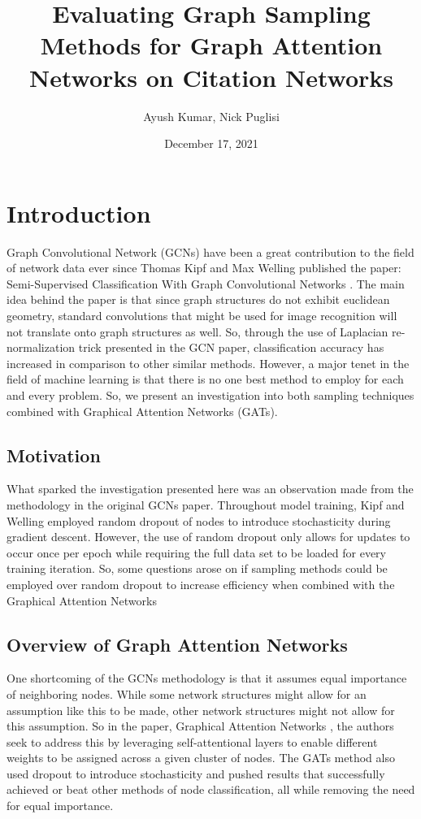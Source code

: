 \documentclass{article}
\title{Evaluating Graph Sampling Methods for Graph Attention Networks on Citation Networks}
\author{Ayush Kumar, Nick Puglisi}
\date{December 17, 2021}
\begin{document}
	\maketitle
	\tableofcontents
	\pagebreak
	\section{Introduction}
	
	Graph Convolutional Network (GCNs) have been a great contribution to the field of network data ever since Thomas Kipf and Max Welling published the paper: Semi-Supervised Classification With Graph Convolutional Networks \cite{kipf2017semisupervised}. The main idea behind the paper is that since graph structures do not exhibit euclidean geometry, standard convolutions that might be used for image recognition will not translate onto graph structures as well. So, through the use of Laplacian re-normalization trick presented in the GCN paper, classification accuracy	has increased in comparison to other similar methods. However, a major tenet in the field of machine learning is that there is no one best method to employ for each and every problem. So, we present an investigation into both sampling techniques combined with Graphical Attention Networks (GATs).

	\subsection{Motivation}
	
	What sparked the investigation presented here was an observation made from the methodology  in the original GCNs paper. 
	Throughout model training, Kipf and Welling employed random dropout of nodes to introduce stochasticity during gradient descent. However, the use of random dropout only allows
	for updates to occur once per epoch while requiring the full data set to be loaded for every training iteration. So, some questions arose on if 
	sampling methods could be employed over random dropout to increase efficiency when combined with the Graphical Attention Networks
	
	\subsection{Overview of Graph Attention Networks}
	
	One shortcoming of the GCNs methodology is that it assumes equal importance of neighboring nodes. While some network structures might allow for
	an assumption like this to be made, other network structures might not allow for this assumption. So in the paper, 
	Graphical Attention Networks \cite{velockovic2018graph}, the authors seek to address this by leveraging self-attentional layers to enable different weights to be assigned across a given cluster of nodes. 
	The GATs method also used dropout to introduce stochasticity and pushed results that successfully achieved or beat other methods of node classification, all while 
	removing the need for equal importance.
\end{document}
